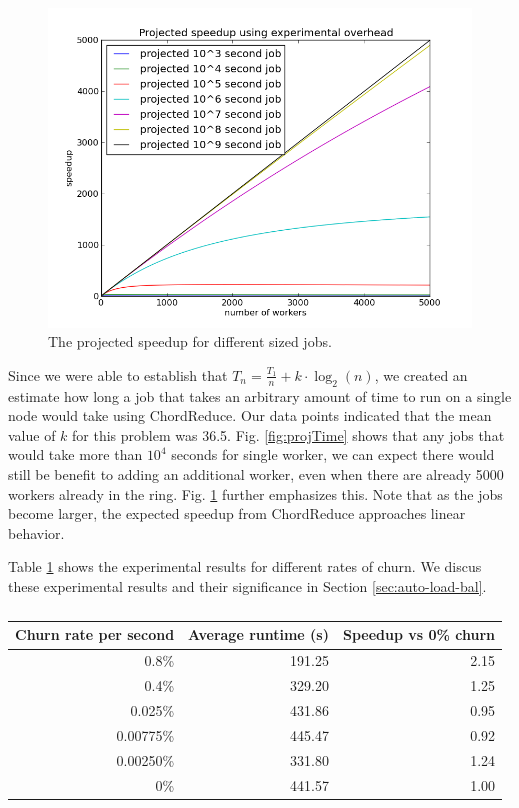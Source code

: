 \begin{figure}
	\centering
	\includegraphics[width=0.5\linewidth]{figs/projSpeed}
	\caption{The projected speedup for different sized jobs. }
	\label{fig:projSpeed}
\end{figure}

Since we were able to establish that $T_{n} = \frac{T_{1}}{n} + k \cdot \log_{2}(n)$, we created an estimate how long a job that takes an arbitrary amount of time to run on a single node would take using ChordReduce.  
Our data points indicated that the mean value of $k$ for this problem was 36.5.  
Fig. \ref{fig:projTime} shows that any jobs that would take more than $10^{4}$ seconds for single worker, we can expect there would still be benefit to adding an additional worker, even when there are already 5000 workers already in the ring.  
Fig. \ref{fig:projSpeed} further emphasizes this. Note that as the jobs become larger, the expected speedup from ChordReduce  approaches linear behavior.


Table \ref{tab:churnSpeed} shows the experimental results for different rates of churn. 
We discus these experimental results and their significance in Section \ref{sec:auto-load-bal}.
\begin{table}
	\centering
	\begin{tabular}{|r|r|r|}
		\hline
		Churn rate per second & Average runtime (s) & Speedup vs 0\% churn\\ \hline{}
		0.8\% & 191.25 & 2.15 \\ \hline
		0.4\% & 329.20 & 1.25 \\ \hline
		0.025\% & 431.86 & 0.95 \\ \hline
		0.00775\%  & 445.47 & 0.92 \\ \hline
		0.00250\% & 331.80  &  1.24 \\ \hline
		0\% & 441.57 & 1.00 \\ \hline
	\end{tabular}
	\caption{}
	\label{tab:churnSpeed}
\end{table}


